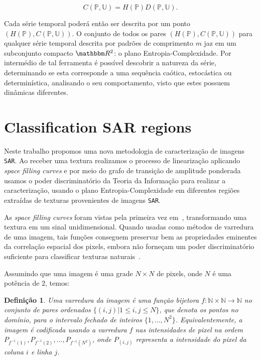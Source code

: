 \documentclass[12pt]{article}
\begin{document}
\begin{equation}
C(\mathbb{P}, \mathbb{U}) = H(\mathbb{P}) D(\mathbb{P}, \mathbb{U}).
\end{equation}

Cada série temporal poderá então ser descrita por um ponto $(H(\mathbb{P}), C(\mathbb{P}, \mathbb{U}))$.
O conjunto de todos os pares $(H(\mathbb{P}), C(\mathbb{P}, \mathbb{U}))$ para qualquer série temporal descrita por padrões de comprimento $m$ jaz em um subconjunto compacto $\mathbbm R^2$: o plano Entropia-Complexidade. 
Por intermédio de tal ferramenta é possível descobrir a natureza da série, determinando se esta corresponde a uma sequência caótica, estocástica ou determinística, analisando o seu comportamento, visto que estes possuem dinâmicas diferentes.

\section{Classification SAR regions}\label{SAR}

Neste trabalho propomos uma nova metodologia de caracterização de imagens \texttt{SAR}. 
Ao receber uma textura realizamos o processo de linearização aplicando \textit{space filling curves} e por meio do grafo de transição de amplitude ponderada usamos o poder discriminatório da Teoria da Informação para realizar a caracterização, usando o plano Entropia-Complexidade em diferentes regiões extraídas de texturas provenientes de imagens \texttt{SAR}.

As \textit{space filling curves} foram vistas pela primeira vez em~\cite{Nguyen1982SpaceFC}, transformando uma textura em um sinal unidimensional.
Quando usadas como métodos de varredura de uma imagem, tais funções conseguem preservar bem as propriedades eminentes da correlação espacial dos pixels, embora não forneçam um poder discriminatório suficiente para classificar texturas naturais~\citep{Lee1994Texture}. 

Assumindo que uma imagem é uma grade $N \times N$ de pixels, onde $N$ é uma potência de $2$, temos: 

\newtheorem{mydef}{Definição}
\begin{mydef}
    Uma varredura da imagem é uma função bijetora $f: \mathbb{N} \times \mathbb{N} \to \mathbb{N}$ no conjunto de pares ordenados $\{(i,j) | 1\leq i,j \leq N\}$, que denota os pontos no domínio, para o intervalo fechado de inteiros $\{1, \dots, N^2\}$. Equivalentemente, a imagem é codificada usando a varredura $f$ nas intensidades de pixel na ordem $P_{f^{-1}(1)}, P_{f^{-1}(2)}, \dots, P_{f^{-1}(N^2)}$, onde $P_{(i,j)}$ representa a intensidade do pixel da coluna $i$ e linha $j$.
    \label{def:CurveFilling}
\end{mydef}
\end{document}
